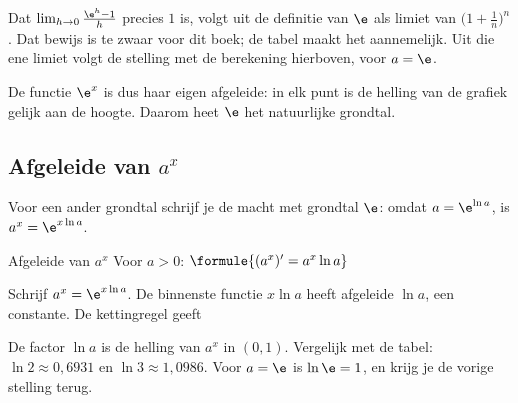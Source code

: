 Dat $\lim_{h \to 0} \frac{\e^h - 1}{h}$ precies $1$ is, volgt uit de definitie van $\e$ als limiet van $\bigl(1 + \frac1n\bigr)^n$. Dat bewijs is te zwaar voor dit boek; de tabel maakt het aannemelijk. Uit die ene limiet volgt de stelling met de berekening hierboven, voor $a = \e$.

De functie $\e^x$ is dus haar eigen afgeleide: in elk punt is de helling van de grafiek gelijk aan de hoogte. Daarom heet $\e$ het natuurlijke grondtal.


\begin{oefeningen}
\end{oefeningen}

\subsection{Afgeleide van \texorpdfstring{$a^x$}{a tot de x}}

Voor een ander grondtal schrijf je de macht met grondtal $\e$: omdat $a = \e^{\ln a}$, is $a^x = \e^{x \ln a}$.

\begin{theorie}
\begin{stelling}{Afgeleide van \texorpdfstring{$a^x$}{a tot de x}}
Voor $a > 0$: \quad $\formule{(a^x)' = a^x \ln a}$
\end{stelling}
\begin{bewijs}
Schrijf $a^x = \e^{x \ln a}$. De binnenste functie $x \ln a$ heeft afgeleide $\ln a$, een constante. De kettingregel geeft
\end{bewijs}
\end{theorie}

De factor $\ln a$ is de helling van $a^x$ in $(0, 1)$. Vergelijk met de tabel: $\ln 2 \approx 0{,}6931$ en $\ln 3 \approx 1{,}0986$. Voor $a = \e$ is $\ln \e = 1$, en krijg je de vorige stelling terug.

